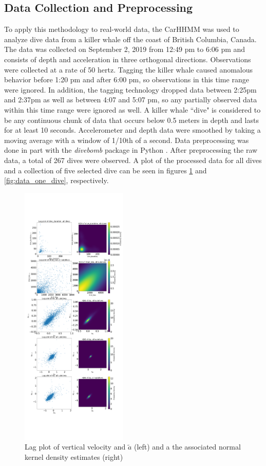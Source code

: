 

\subsection{Data Collection and Preprocessing}

To apply this methodology to real-world data, the CarHHMM was used to analyze dive data from a killer whale off the coast of British Columbia, Canada. The data was collected on September 2, 2019 from 12:49 pm to 6:06 pm and consists of depth and acceleration in three orthogonal directions. Observations were collected at a rate of 50 hertz. Tagging the killer whale caused anomalous behavior before 1:20 pm and after 6:00 pm, so observations in this time range were ignored. In addition, the tagging technology dropped data between 2:25pm and 2:37pm as well as between 4:07 and 5:07 pm, so any partially observed data within this time range were ignored as well. A killer whale ``dive" is considered to be any continuous chunk of data that occurs below 0.5 meters in depth and lasts for at least 10 seconds. Accelerometer and depth data were smoothed by taking a moving average with a window of 1/10th of a second. Data preprocessing was done in part with the \textit{divebomb} package in Python \cite{Nunes:2018}. After preprocessing the raw data, a total of 267 dives were observed. A plot of the processed data for all dives and a collection of five selected dive can be seen in figures \ref{fig:data} and \ref{fig:data_one_dive}, respectively.

\begin{figure}[h!]
	\centering
	\includegraphics[height=5in]{../Plots/lagplot.png}
	\caption{Lag plot of vertical velocity and $\tilde a$ (left) and a the associated normal kernel density estimates (right)}
	\label{fig:data}
\end{figure}


